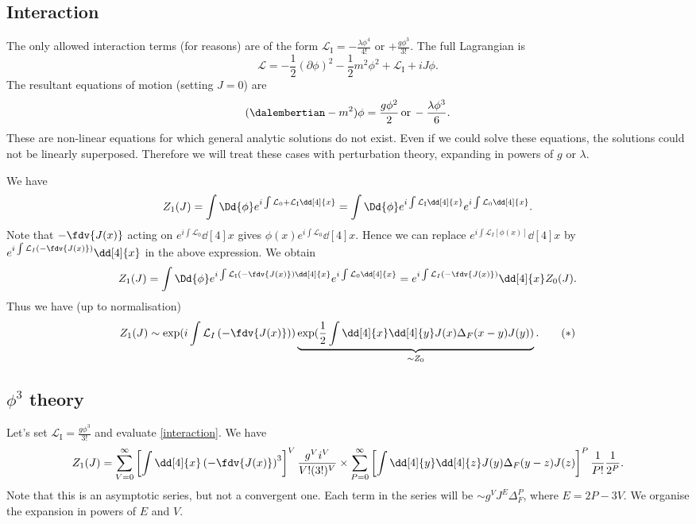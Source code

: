 \documentclass{jknotes} %
\begin{document}
\subsection{Interaction}
The only allowed interaction terms (for reasons) are of the form \(\mathcal{L}_{\mathrm{I}} = -\frac{\lambda\phi^4}{4!}\) or \(+\frac{g\phi^3}{3!}\). The full Lagrangian is
\begin{equation}
    \mathcal{L} = -\frac{1}{2}(\partial\phi)^2-\frac{1}{2}m^2\phi^2 + \mathcal{L}_{\mathrm{I}} + iJ\phi.
\end{equation}
The resultant equations of motion (setting \(J=0\)) are
\begin{equation}
    (\dalembertian - m^2)\phi=\frac{g\phi^2}{2} \,\text{or}\, -\frac{\lambda\phi^3}{6}.
\end{equation}
These are non-linear equations for which general analytic solutions do not exist. Even if we could solve these equations, the solutions could not be linearly superposed. Therefore we will treat these cases with perturbation theory, expanding in powers of \(g\) or \(\lambda\).

We have
\begin{equation}
    Z_1(J) = \int\Dd{\phi}e^{i\int\mathcal{L}_0+\mathcal{L}_{\mathrm{I}}\dd[4]{x}} = \int\Dd{\phi}e^{i\int\mathcal{L}_{\mathrm{I}}\dd[4]{x}}e^{i\int\mathcal{L}_0\dd[4]{x}}.
\end{equation}
Note that \(-\fdv{J(x)}\) acting on \(e^{i\int\mathcal{L}_0}\dd[4]{x}\) gives \(\phi(x)e^{i\int\mathcal{L}_0}\dd[4]{x}\). Hence we can replace \(e^{i\int\mathcal{L}_I[\phi(x)]}\dd[4]{x}\) by \(e^{i\int\mathcal{L}_I\left(-\fdv{J(x)}\right)}\dd[4]{x}\) in the above expression. We obtain
\begin{equation}
    Z_1(J) = \int\Dd{\phi}e^{i\int\mathcal{L}_{\mathrm{I}}\left(-\fdv{J(x)}\right)\dd[4]{x}}e^{i\int\mathcal{L}_0\dd[4]{x}} = e^{i\int\mathcal{L}_I\left(-\fdv{J(x)}\right)}\dd[4]{x} Z_0(J).
\end{equation}
Thus we have (up to normalisation)
\begin{equation}
    Z_1(J)\sim \exp(i\int\mathcal{L}_I\left(-\fdv{J(x)}\right)) \underbrace{\exp(\frac{1}{2}\int\dd[4]{x}\dd[4]{y}J(x)\Delta_F(x-y)J(y))}_{\sim Z_0}.
    \tag{\(*\)}
    \label{interaction}
\end{equation}

\subsection{\texorpdfstring{$\phi^3$}{Phi-cubed} theory}
Let's set \(\mathcal{L}_{\mathrm{I}} = \frac{g\phi^3}{3!}\) and evaluate \eqref{interaction}. We have
\begin{equation}
    Z_1(J) = \sum^\infty_{V=0}\left[\int\dd[4]{x}\left(-\fdv{J(x)}\right)^3\right]^V\frac{g^Vi^V}{V!(3!)^V} \times \sum^\infty_{P=0}\left[\int\dd[4]{y}\dd[4]{z}J(y)\Delta_F(y-z)J(z)\right]^P \frac{1}{P!}\frac{1}{2^P}.
\end{equation}
Note that this is an asymptotic series, but not a convergent one. Each term in the series will be \(\sim g^V J^E \Delta_F^P\), where \(E = 2P-3V\). We organise the expansion in powers of \(E\) and \(V\).
\end{document}
